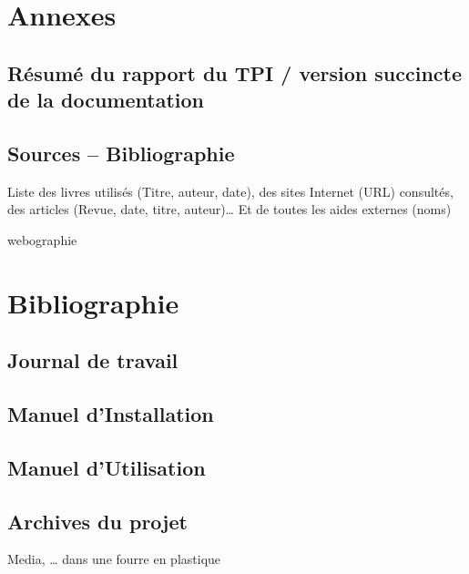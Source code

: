 \chapter{Annexes}
\section{Résumé du rapport du TPI / version succincte de la documentation}

\section{Sources – Bibliographie}
Liste des livres utilisés (Titre, auteur, date), des sites Internet (URL) consultés, des articles (Revue, date, titre, auteur)… Et de toutes les aides externes (noms)


\begin{btSect}[plain]{webographie}
   \chapter{Bibliographie}
      \btPrintAll
\end{btSect}

\section{Journal de travail}

\section{Manuel d'Installation}

\section{Manuel d'Utilisation}

\section{Archives du projet }
Media, … dans une fourre en plastique 

